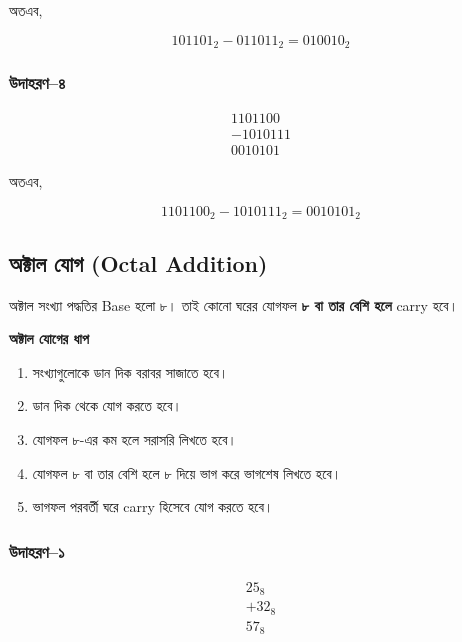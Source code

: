 অতএব,

\[
\boxed{101101_2-011011_2=010010_2}
\]

\subsubsection*{উদাহরণ--৪}

\[
\begin{array}{r}
1101100\\
-1010111\\
\hline
0010101
\end{array}
\]

অতএব,

\[
\boxed{1101100_2-1010111_2=0010101_2}
\]


\subsection{অক্টাল যোগ
(\textenglish{Octal Addition})}

অক্টাল সংখ্যা পদ্ধতির
\textenglish{Base} হলো ৮।
তাই কোনো ঘরের যোগফল
\textbf{৮ বা তার বেশি হলে}
\textenglish{carry} হবে।

\par\begingroup

\textbf{অক্টাল যোগের ধাপ}

\begin{enumerate}
    \item সংখ্যাগুলোকে ডান দিক বরাবর সাজাতে হবে।
    \item ডান দিক থেকে যোগ করতে হবে।
    \item যোগফল ৮-এর কম হলে সরাসরি লিখতে হবে।
    \item যোগফল ৮ বা তার বেশি হলে ৮ দিয়ে ভাগ করে
    ভাগশেষ লিখতে হবে।
    \item ভাগফল পরবর্তী ঘরে
    \textenglish{carry} হিসেবে যোগ করতে হবে।
\end{enumerate}
\par\endgroup


\subsubsection*{উদাহরণ--১}

\[
\begin{array}{r}
25_8\\
+32_8\\
\hline
57_8
\end{array}
\]

